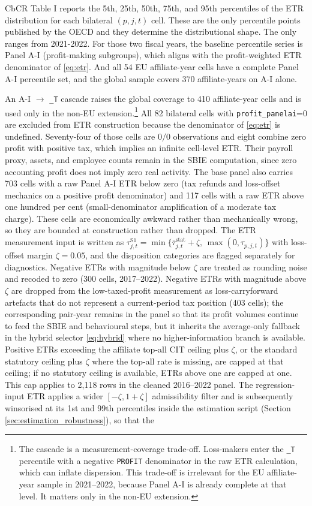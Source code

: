 \documentclass[11pt,a4paper]{article}
\newcommand{\code}[1]{\texttt{#1}}
\begin{document}
CbCR Table I reports the 5th, 25th, 50th, 75th, and 95th percentiles of the ETR distribution for each bilateral $(p, j, t)$ cell. These are the only percentile points published by the OECD and they determine the distributional shape. The only ranges from 2021-2022. For those two fiscal years, the baseline percentile series is Panel A-I (profit-making subgroups), which aligns with the profit-weighted ETR denominator of \eqref{eq:etr}. And all 54 EU affiliate-year cells have a complete Panel A-I percentile set, and the global sample covers 370 affiliate-years on A-I alone. 

An A-I $\rightarrow$ \code{\_T} cascade raises the global coverage to 410 affiliate-year cells and is used only in the non-EU extension.\footnote{The cascade is a measurement-coverage trade-off. Loss-makers enter the \code{\_T} percentile with a negative \code{PROFIT} denominator in the raw ETR calculation, which can inflate dispersion. This trade-off is irrelevant for the EU affiliate-year sample in 2021--2022, because Panel A-I is already complete at that level. It matters only in the non-EU extension.} All 82 bilateral cells with \code{profit\_panelai}=0 are excluded from ETR construction because the denominator of \eqref{eq:etr} is undefined. Seventy-four of those cells are $0/0$ observations and eight combine zero profit with positive tax, which implies an infinite cell-level ETR. Their payroll proxy, assets, and employee counts remain in the SBIE computation, since zero accounting profit does not imply zero real activity. The base panel also carries 703 cells with a raw Panel A-I ETR below zero (tax refunds and loss-offset mechanics on a positive profit denominator) and 117 cells with a raw ETR above one hundred per cent (small-denominator amplification of a moderate tax charge). These cells are economically awkward rather than mechanically wrong, so they are bounded at construction rather than dropped. The ETR measurement input is written as $\tau_{j,t}^{\text{S1}} = \min\{\bar{\tau}_{j,t}^{\text{stat}} + \zeta,\,\max(0,\tau_{p,j,t})\}$ with loss-offset margin $\zeta = 0.05$, and the disposition categories are flagged separately for diagnostics. Negative ETRs with magnitude below $\zeta$ are treated as rounding noise and recoded to zero (300 cells, 2017--2022). Negative ETRs with magnitude above $\zeta$ are dropped from the low-taxed-profit measurement as loss-carryforward artefacts that do not represent a current-period tax position (403 cells); the corresponding pair-year remains in the panel so that its profit volumes continue to feed the SBIE and behavioural steps, but it inherits the average-only fallback in the hybrid selector \eqref{eq:hybrid} where no higher-information branch is available. Positive ETRs exceeding the affiliate top-all CIT ceiling plus $\zeta$, or the standard statutory ceiling plus $\zeta$ where the top-all rate is missing, are capped at that ceiling; if no statutory ceiling is available, ETRs above one are capped at one. This cap applies to 2{,}118 rows in the cleaned 2016--2022 panel. The regression-input ETR applies a wider $[-\zeta, 1+\zeta]$ admissibility filter and is subsequently winsorised at its 1st and 99th percentiles inside the estimation script (Section \ref{sec:estimation_robustness}), so that the 
\end{document}
